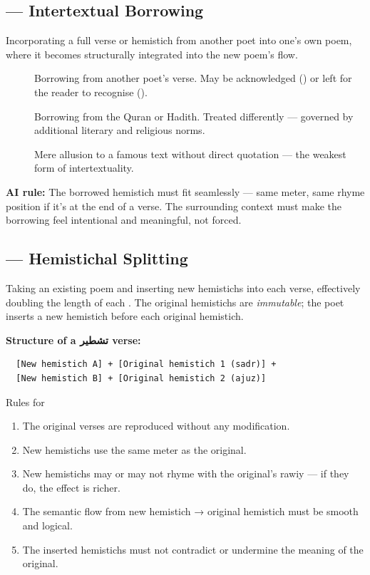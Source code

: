 \subsection{ — Intertextual Borrowing}
\label{subsec:tadmin}

Incorporating a full verse or hemistich from another poet into one's own poem, where it becomes structurally integrated into the new poem's flow.

\begin{description}
  \item[] Borrowing from another poet's verse. May be acknowledged () or left for the reader to recognise ().
  \item[] Borrowing from the Quran or Hadith. Treated differently — governed by additional literary and religious norms.
  \item[] Mere allusion to a famous text without direct quotation — the weakest form of intertextuality.
\end{description}

\textbf{AI rule:} The borrowed hemistich must fit seamlessly — same meter, same rhyme position if it's at the end of a verse. The surrounding context must make the borrowing feel intentional and meaningful, not forced.

\subsection{ — Hemistichal Splitting}
\label{subsec:tashtir}

Taking an existing poem and inserting new hemistichs into each verse, effectively doubling the length of each . The original hemistichs are \textit{immutable}; the poet inserts a new hemistich before each original hemistich.

\textbf{Structure of a تشطير verse:}
\begin{verbatim}
  [New hemistich A] + [Original hemistich 1 (sadr)] +
  [New hemistich B] + [Original hemistich 2 (ajuz)]
\end{verbatim}

\begin{rulebox}{Rules for }
\begin{enumerate}
  \item The original verses are reproduced without any modification.
  \item New hemistichs use the same meter as the original.
  \item New hemistichs may or may not rhyme with the original's rawiy — if they do, the effect is richer.
  \item The semantic flow from new hemistich → original hemistich must be smooth and logical.
  \item The inserted hemistichs must not contradict or undermine the meaning of the original.
\end{enumerate}
\end{rulebox}

